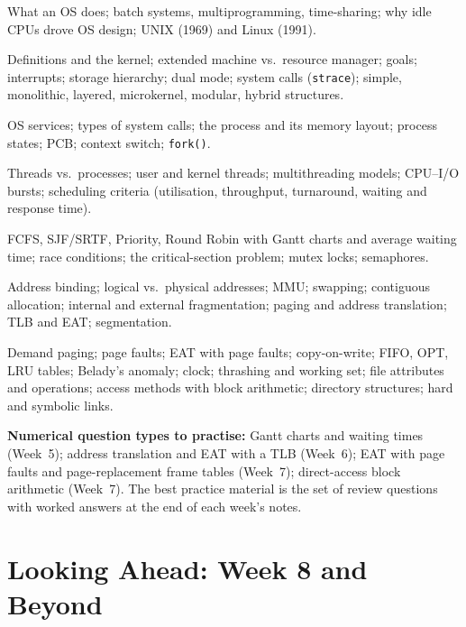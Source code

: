 \documentclass[11pt,a4paper]{article}
\newcommand{\cmd}[1]{\texttt{#1}}
\begin{document}
\begin{description}[leftmargin=0pt,itemsep=0.2em]
  \item[Week 1: History] What an OS does; batch systems, multiprogramming, time-sharing; why idle CPUs drove OS design; UNIX (1969) and Linux (1991).
  \item[Week 2: OS basics] Definitions and the kernel; extended machine vs.\ resource manager; goals; interrupts; storage hierarchy; dual mode; system calls (\cmd{strace}); simple, monolithic, layered, microkernel, modular, hybrid structures.
  \item[Week 3: Processes] OS services; types of system calls; the process and its memory layout; process states; PCB; context switch; \cmd{fork()}.
  \item[Week 4: Threads, CPU] Threads vs.\ processes; user and kernel threads; multithreading models; CPU--I/O bursts; scheduling criteria (utilisation, throughput, turnaround, waiting and response time).
  \item[Week 5: Scheduling, sync] FCFS, SJF/SRTF, Priority, Round Robin with Gantt charts and average waiting time; race conditions; the critical-section problem; mutex locks; semaphores.
  \item[Week 6: Memory] Address binding; logical vs.\ physical addresses; MMU; swapping; contiguous allocation; internal and external fragmentation; paging and address translation; TLB and EAT; segmentation.
  \item[Week 7: VM, files] Demand paging; page faults; EAT with page faults; copy-on-write; FIFO, OPT, LRU tables; Belady's anomaly; clock; thrashing and working set; file attributes and operations; access methods with block arithmetic; directory structures; hard and symbolic links.
\end{description}

\textbf{Numerical question types to practise:} Gantt charts and waiting times (Week~5); address translation and EAT with a TLB (Week~6); EAT with page faults and page-replacement frame tables (Week~7); direct-access block arithmetic (Week~7). The best practice material is the set of review questions with worked answers at the end of each week's notes.

\section{Looking Ahead: Week 8 and Beyond}
\end{document}
